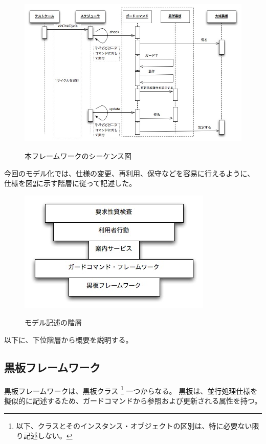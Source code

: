 \documentclass[a4paper,8pt]{jsarticle}
\begin{document}
\begin{figure}[h]
	\centering
	{\includegraphics[width=50zw, height=40zw, keepaspectratio, bb=0 0 400 300]{image/SeqDiagram.jpg}}
	\caption{本フレームワークのシーケンス図}
	\label{fig:seqDiagram}
\end{figure}


今回のモデル化では、仕様の変更、再利用、保守などを容易に行えるように、
仕様を図\ref{fig:hierarchie}に示す階層に従って記述した。

\begin{figure}[h]
	\centering
	{\includegraphics[width=35zw, height=40zw, keepaspectratio, bb=0 0 600 300]{image/hierarchies.jpg}}
	\caption{モデル記述の階層}
	\label{fig:hierarchie}
\end{figure}

以下に、下位階層から概要を説明する。

\subsection{黒板フレームワーク}
黒板フレームワークは、黒板クラス
\footnote{以下、クラスとそのインスタンス・オブジェクトの区別は、特に必要ない限り記述しない。}
一つからなる。
黒板は、並行処理仕様を擬似的に記述するため、ガードコマンドから参照および更新される属性を持つ。
\end{document}
